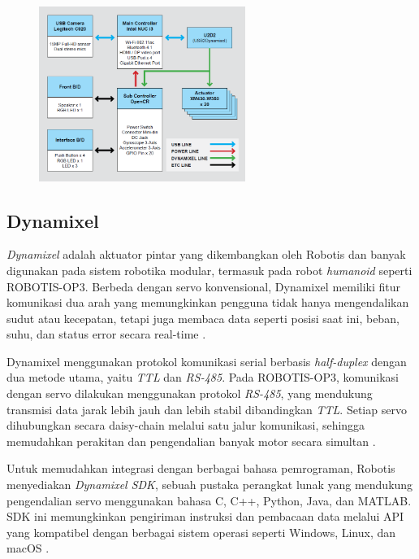 \begin{figure}[H]
    \centering
    \includegraphics[width=0.6\textwidth]{images/op3_system.png}
    \label{fig:system_op3}
\end{figure}

\subsection{Dynamixel}

\textit{Dynamixel} adalah aktuator pintar yang dikembangkan oleh Robotis dan banyak digunakan pada sistem robotika modular, termasuk pada robot \textit{humanoid} seperti ROBOTIS-OP3. Berbeda dengan servo konvensional, Dynamixel memiliki fitur komunikasi dua arah yang memungkinkan pengguna tidak hanya mengendalikan sudut atau kecepatan, tetapi juga membaca data seperti posisi saat ini, beban, suhu, dan status error secara real-time \cite{robotis_dynamixel}.

Dynamixel menggunakan protokol komunikasi serial berbasis \textit{half-duplex} dengan dua metode utama, yaitu \textit{TTL} dan \textit{RS-485}. Pada ROBOTIS-OP3, komunikasi dengan servo dilakukan menggunakan protokol \textit{RS-485}, yang mendukung transmisi data jarak lebih jauh dan lebih stabil dibandingkan \textit{TTL}. Setiap servo dihubungkan secara daisy-chain melalui satu jalur komunikasi, sehingga memudahkan perakitan dan pengendalian banyak motor secara simultan \cite{robotis_manual}.

Untuk memudahkan integrasi dengan berbagai bahasa pemrograman, Robotis menyediakan \textit{Dynamixel SDK}, sebuah pustaka perangkat lunak yang mendukung pengendalian servo menggunakan bahasa C, C++, Python, Java, dan MATLAB. SDK ini memungkinkan pengiriman instruksi dan pembacaan data melalui API yang kompatibel dengan berbagai sistem operasi seperti Windows, Linux, dan macOS \cite{robotis_sdk}.

